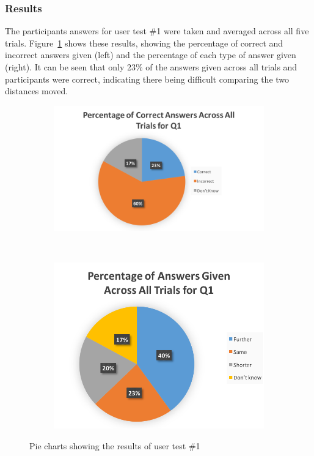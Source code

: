 \documentclass[../../main.tex]{subfiles}
\begin{document}
		\subsubsection{Results}
			The participants answers for user test \#1 were taken and averaged across all five trials. Figure~\ref{test1Results} shows these results, showing the percentage of correct and incorrect answers given (left) and the percentage of each type of answer given (right). It can be seen that only 23\% of the answers given across all trials and participants were correct, indicating there being difficult comparing the two distances moved.

			\begin{figure}[H]
				\begin{subfigure}{0.5\textwidth}
					\centerline{\includegraphics[scale = 0.7]{Sections/userTesting/images/test1/Q1Pie1_edit.png}}
				\end{subfigure}
				~
				\begin{subfigure}{0.5\textwidth}
					\centerline{\includegraphics[scale = 0.7]{Sections/userTesting/images/test1/Q1Pie2.png}}
				\end{subfigure}
				\caption{Pie charts showing the results of user test \#1}
				\label{test1Results}
			\end{figure}
\end{document}
